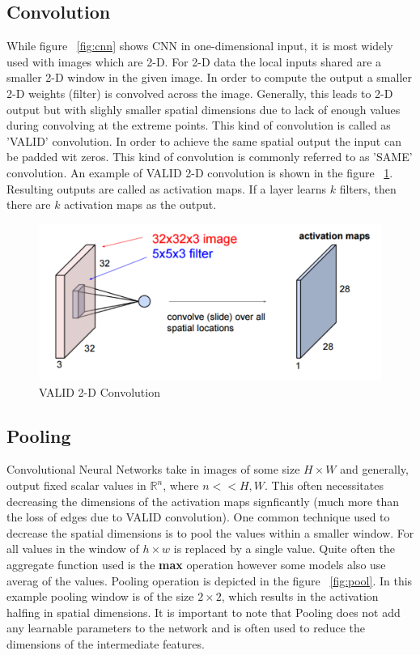 \subsection{Convolution}

While figure ~\ref{fig:cnn} shows CNN in one-dimensional input, it is most widely used with images which are 2-D.
For 2-D data the local inputs shared are a smaller 2-D window in the given image. 
In order to compute the output a smaller 2-D weights (filter) is convolved across the image. 
Generally, this leads to 2-D output but with slighly smaller spatial dimensions due to lack of enough values during convolving at the extreme points. This kind of convolution is called as 'VALID' convolution. In order to achieve the same spatial output the input can be padded wit zeros. This kind of convolution is commonly referred to as 'SAME' convolution. An example of VALID 2-D convolution is shown in the figure ~\ref{fig:cnn2d}. Resulting outputs are called as activation maps. If a layer learns $k$ filters, then there are $k$ activation maps as the output.


\begin{figure}[H]
	\centering
   \includegraphics[scale=0.39]{figures/intro/cnn2d.png}
   \caption[2-D Convolution]{VALID 2-D Convolution}
   \label{fig:cnn2d}
\end{figure}

\subsection{Pooling}

Convolutional Neural Networks take in images of some size $H \times W$ and generally, output fixed scalar values in $\mathbb{R}^n$, where $n << H, W$. This often necessitates decreasing the dimensions of the activation maps signficantly (much more than the loss of edges due to VALID convolution). One common technique used to decrease the spatial dimensions is to pool the values within a smaller window. For all values in the window of $h \times w$ is replaced by a single value. Quite often the aggregate function used is the \textbf{max} operation however some models also use averag of the values. Pooling operation is depicted in the figure ~\ref{fig:pool}. In this example pooling window is of the size $2\times2$, which results in the activation halfing in spatial dimensions. 
It is important to note that Pooling does not add any learnable parameters to the network and is often used to reduce the dimensions of the intermediate features.

